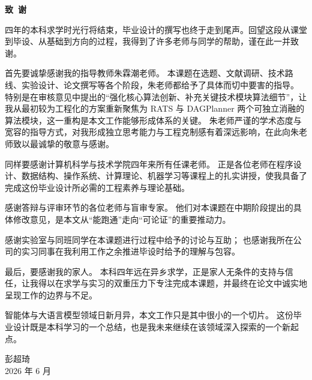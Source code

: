 \cleardoublepage{}
\begin{center}
    \bfseries {} 致~谢
\end{center}

\par 四年的本科求学时光行将结束，毕业设计的撰写也终于走到尾声。回望这段从课堂到毕设、从基础到方向的过程，我得到了许多老师与同学的帮助，谨在此一并致谢。

\par 首先要诚挚感谢我的指导教师朱霖潮老师。
本课题在选题、文献调研、技术路线、实验设计、论文撰写等各个阶段，朱老师都给予了具体而切中要害的指导。
特别是在审核意见中提出的“强化核心算法创新、补充关键技术模块算法细节”，让我从最初较为工程化的方案重新聚焦为 RATS 与 DAGPlanner 两个可独立消融的算法模块，这一重构是本文工作能够形成体系的关键。
朱老师严谨的学术态度与宽容的指导方式，对我形成独立思考能力与工程克制感有着深远影响，在此向朱老师致以最诚挚的敬意与感谢。

\par 同样要感谢计算机科学与技术学院四年来所有任课老师。
正是各位老师在程序设计、数据结构、操作系统、计算理论、机器学习等课程上的扎实讲授，使我具备了完成这份毕业设计所必需的工程素养与理论基础。

\par 感谢答辩与评审环节的各位老师与盲审专家。
他们对本课题在中期阶段提出的具体修改意见，是本文从“能跑通”走向“可论证”的重要推动力。

\par 感谢实验室与同班同学在本课题进行过程中给予的讨论与互助；
也感谢我所在公司的实习同事在我利用工作之余推进毕设时给予的理解与包容。

\par 最后，要感谢我的家人。
本科四年远在异乡求学，正是家人无条件的支持与信任，让我得以在求学与实习的双重压力下专注完成本课题，并最终在论文中诚实地呈现工作的边界与不足。

\par 智能体与大语言模型领域日新月异，本文工作只是其中很小的一个切片。
这份毕业设计既是本科学习的一个总结，也是我未来继续在该领域深入探索的一个新起点。

\vspace{1em}
\begin{flushright}
彭超琦\\
2026 年 6 月
\end{flushright}
